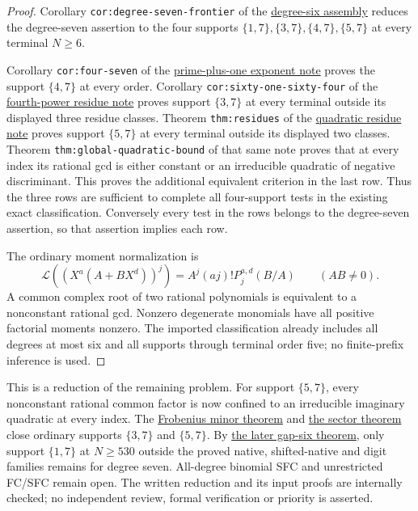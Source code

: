 \documentclass[11pt]{article}
\begin{document}
\begin{proof}
Corollary \texttt{cor:degree-seven-frontier} of the
\href{ORDINARY_DEGREE_SIX_BINOMIAL_SFC.tex}{degree-six assembly}
reduces the degree-seven assertion to the four supports
$\{1,7\},\{3,7\},\{4,7\},\{5,7\}$ at every terminal $N\ge6$.

Corollary \texttt{cor:four-seven} of the
\href{PRIME_PLUS_ONE_EXPONENT_GAP_SFC.tex}{prime-plus-one exponent note}
proves the support $\{4,7\}$ at every order.
Corollary \texttt{cor:sixty-one-sixty-four} of the
\href{LOWER_THREE_FOURTH_POWER_RESIDUE_REDUCTION.tex}{fourth-power residue note}
proves support $\{3,7\}$ at every terminal outside its displayed
three residue classes.
Theorem \texttt{thm:residues} of the
\href{LOWER_FIVE_QUADRATIC_RESIDUE_REDUCTION.tex}{quadratic residue note}
proves support $\{5,7\}$ at every terminal outside its displayed
two classes.
Theorem \texttt{thm:global-quadratic-bound} of that same note
proves that at every index its rational gcd is either constant or
an irreducible quadratic of negative discriminant.
This proves the additional equivalent criterion in the last row.
Thus the three rows are sufficient to complete all four-support
tests in the existing exact classification.
Conversely every test in the rows belongs to the degree-seven
assertion, so that assertion implies each row.

The ordinary moment normalization is
\[
 \mathcal L((X^a(A+BX^d))^j)=A^j(aj)!P_j^{a,d}(B/A)
 \qquad(AB\ne0).
\]
A common complex root of two rational polynomials is equivalent to
a nonconstant rational gcd. Nonzero degenerate monomials have all
positive factorial moments nonzero.
The imported classification already includes all degrees at most six
and all supports through terminal order five; no finite-prefix
inference is used.
\end{proof}

This is a reduction of the remaining problem.
For support $\{5,7\}$, every nonconstant rational common factor
is now confined to an irreducible imaginary quadratic at every index.
The \href{LOWER_THREE_FOURTH_POWER_FROBENIUS_SFC.tex}{Frobenius minor theorem}
and \href{LOWER_FIVE_QUADRATIC_SECTOR_SFC.tex}{the sector theorem} close ordinary supports $\{3,7\}$ and $\{5,7\}$.
By \href{PHYSICAL_PRIME_ANALYTIC_INTERPOLATION.tex}{the later gap-six theorem}, only support $\{1,7\}$ at $N\ge530$ outside
the proved native, shifted-native and digit families remains for degree
seven. All-degree binomial SFC and unrestricted FC/SFC remain open.
The written reduction and its input proofs are
internally checked; no independent review, formal verification or
priority is asserted.
\end{document}
